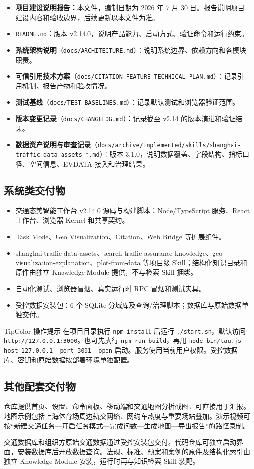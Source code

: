 \documentclass[a4paper,11pt]{article}
\newenvironment{tip}     {\begin{admonition}{TipColor}     {操作提示}}{\end{admonition}}
\newcommand{\code}[1]{\texttt{#1}}
\newcommand{\term}[1]{\textbf{#1}}
\begin{document}
\begin{itemize}
  \item \term{项目建设说明报告：}本文件，编制日期为 2026 年 7 月 30 日。报告说明项目建设内容和验收边界，后续更新以本文件为准。
  \item \code{README.md}：版本 v2.14.0，说明产品能力、启动方式、验证命令和运行约束。
  \item \term{系统架构说明}（\code{docs/ARCHITECTURE.md}）：说明系统边界、依赖方向和各模块职责。
  \item \term{可信引用技术方案}（\code{docs/CITATION\_FEATURE\_TECHNICAL\_PLAN.md}）：记录引用机制、报告产物和验收情况。
  \item \term{测试基线}（\code{docs/TEST\_BASELINES.md}）：记录默认测试和浏览器验证范围。
  \item \term{版本变更记录}（\code{docs/CHANGELOG.md}）：记录截至 v2.14 的版本演进和验证结果。
  \item \term{数据资产说明与审查记录}（\code{docs/archive/implemented/skills/shanghai-traffic-data-assets-*.md}）：版本 3.1.0，说明数据覆盖、字段结构、指标口径、空间信息、EVDATA 接入和治理结果。
\end{itemize}

\subsection{系统类交付物}

\begin{itemize}
  \item 交通态势智能工作台 v2.14.0 源码与构建脚本：Node/TypeScript 服务、React 工作台、浏览器 Kernel 和共享契约。
  \item Task Mode、Geo Visualization、Citation、Web Bridge 等扩展组件。
  \item shanghai-traffic-data-assets、search-traffic-assurance-knowledge、geo-visualization-explanation、plot-from-data 等项目级 Skill；结构化知识目录和原件由独立 Knowledge Module 提供，不与检索 Skill 捆绑。
  \item 自动化测试、浏览器冒烟、真实运行时 RPC 冒烟和测试夹具。
  \item 受控数据安装包：6 个 SQLite 分域库及查询/治理脚本；数据库与原始数据单独交付。
\end{itemize}

\begin{tip}
在项目目录执行 \code{npm install} 后运行 \code{./start.sh}，默认访问 \code{http://127.0.0.1:3000}。也可先执行 \code{npm run build}，再用 \code{node bin/tau.js --host 127.0.0.1 --port 3001 --open} 启动。服务使用当前用户权限。受控数据库、密钥和原始数据按部署环境单独配置。
\end{tip}

\subsection{其他配套交付物}

仓库提供首页、设置、命令面板、移动端和交通地图分析截图，可直接用于汇报。地图示例包括上海体育场周边轨交网络、网约车热度与重要场站叠加。演示视频可按``新建交通任务—开启任务模式—完成问数—生成地图—导出报告''的路径录制。

交通数据库和组织方原始交通数据通过受控安装包交付。代码仓库可独立启动界面，安装数据库后开放数据查询。法规、标准、预案和案例的原件及结构化索引由独立 Knowledge Module 安装，运行时再与知识检索 Skill 装配。
\end{document}
